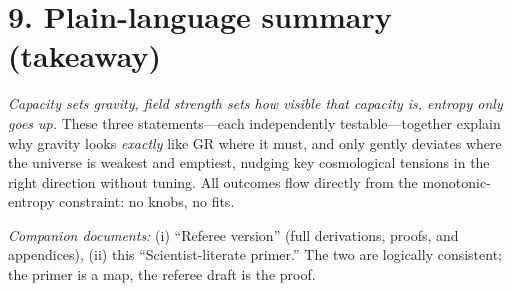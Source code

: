 \documentclass[aps,prd,onecolumn,superscriptaddress,nofootinbib]{revtex4-2}
\begin{document}
\section*{9. Plain-language summary (takeaway)}
\emph{Capacity sets gravity, field strength sets how visible that capacity is, entropy only goes up.} These three statements---each independently testable---together explain why gravity looks \emph{exactly} like GR where it must, and only gently deviates where the universe is weakest and emptiest, nudging key cosmological tensions in the right direction without tuning.
All outcomes flow directly from the monotonic-entropy constraint: no knobs, no fits.

\bigskip
\noindent\textit{Companion documents:} (i) ``Referee version'' (full derivations, proofs, and appendices), (ii) this ``Scientist-literate primer.'' The two are logically consistent; the primer is a map, the referee draft is the proof.
\end{document}
